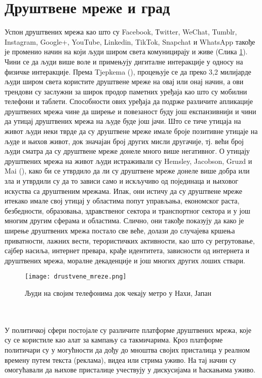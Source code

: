 \documentclass{article}
\begin{document}
\section{Друштвене мреже и град}
Успон друштвених мрежа као што су Facebook, Тwitter, WeChat, Tumblr, Instagram, Google+, YouTube, Linkedin, TikTok, Snapchat и WhatsApp такође је променио начин на који људи широм света комуницирају и живе (Слика \ref{fig:mreze}). Чини се да људи више воле и примењују дигиталне интеракције у односу на физичке интеракције. Према Tjepkema (\cite{t_2019}), процењује се да преко 3,2 милијарде људи широм света користите друштвене мреже на овај или онај начин, а ови трендови су заслужни за широк продор паметних уређаја као што су мобилни телефони и таблети. Способности ових уређаја да подрже различите апликације друштвених мрежа чине да ширење и повезаност буду још експанзивнији и чини да утицај друштвених мрежа на људе буде још јачи. Што се тиче утицаја на живот људи неки тврде да су друштвене мреже имале броје позитивне утицаје на људе и њихов живот, док значајан број других мисли другачије, тј. већи број људи сматра да су друштвене мреже донеле много више негативног. О утицају друштвених мрежа на живот људи истраживали су  Hemsley, Jacobson, Gruzd и Mai (\cite{m_2018}), како би се утврдило да ли су друштвене мреже донеле више добра или зла и утврдили су да то зависи само и искључиво од појединаца и њиховог искуства са друштвеним мрежама. Ипак, они истичу да су друштвене мреже итекако имале свој утицај у областима попут управљања, економског раста, безбедности, образовања, здравственог сектора и транспортног сектора и у још многим другим сферама и областима. Слично, они такође показују да како је ширење друштвених мрежа постало све веће, долази до случајева кршења приватности, лажних вести, терористичких активности, као што су регрутовање, сајбер насиља, интернет превара, крађе идентитета, зависности од интернета и друштвених мрежа, моралне декаденције и још многих других лоших ствари. \\
\begin{figure}[h!]
\centering
\texttt{[image: drustvene\_mreze.png]}
\caption{\label{fig:mreze}Људи на својим телефонима док чекају метро у Нахи, Јапан}
\end{figure}
\\\\
У политичкој сфери постојале су различите платформе друштвених мрежа, које су се користиле као алат за кампању са такмичарима. Кроз платформе политичари су у могућности да дођу до мноштва својих присталица у реалном времену путем текста (реклама), видеа или стрима уживо. На тај начин су омогућавали да њихове присталице учествују у дискусијама и ћаскањима уживо. 
\end{document}
